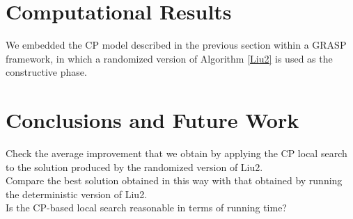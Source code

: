 \documentclass{llncs}
\begin{document}
\section{Computational Results}

We embedded the CP model described in the previous section within a GRASP framework, in which a randomized version of Algorithm \ref{Liu2} is used as the constructive phase.

\section{Conclusions and Future Work}

Check the average improvement that we obtain by applying the CP local search to the solution produced by the randomized version of Liu2.\\

Compare the best solution obtained in this way with that obtained by running the deterministic version of Liu2.\\

Is the CP-based local search reasonable in terms of running time?
\end{document}
